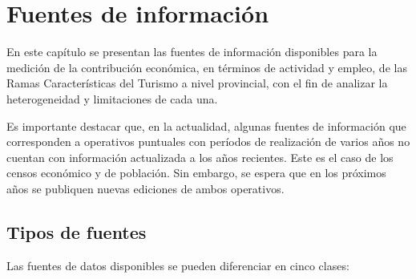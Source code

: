 \documentclass[
  openany]{book}
\begin{document}
\hypertarget{fuentes-informacion}{%
\chapter{\texorpdfstring{\textbf{Fuentes de información}}{Fuentes de información}}\label{fuentes-informacion}}

En este capítulo se presentan las fuentes de información disponibles para la medición de la contribución económica, en términos de actividad y empleo, de las Ramas Características del Turismo a nivel provincial, con el fin de analizar la heterogeneidad y limitaciones de cada una.

Es importante destacar que, en la actualidad, algunas fuentes de información que corresponden a operativos puntuales con períodos de realización de varios años no cuentan con información actualizada a los años recientes. Este es el caso de los censos económico y de población. Sin embargo, se espera que en los próximos años se publiquen nuevas ediciones de ambos operativos.

\hypertarget{tipos-de-fuentes}{%
\section{Tipos de fuentes}\label{tipos-de-fuentes}}

Las fuentes de datos disponibles se pueden diferenciar en cinco clases:
\end{document}
